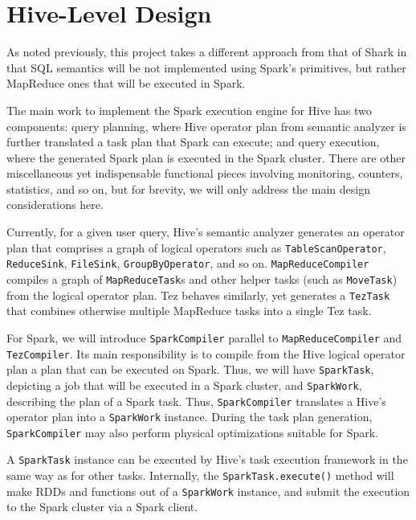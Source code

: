 \documentclass{vldb}
\begin{document}
\section{Hive-Level Design}

As noted previously, this project takes a different approach from that
of Shark in that SQL semantics will be not implemented using Spark's
primitives, but rather MapReduce ones that will be executed in Spark.

The main work to implement the Spark execution engine for Hive has two
components: query planning, where Hive operator plan from semantic
analyzer is further translated a task plan that Spark can execute; and
query execution, where the generated Spark plan is executed in the Spark
cluster. There are other miscellaneous yet indispensable functional
pieces involving monitoring, counters, statistics, and so on, but for
brevity, we will only address the main design considerations here.


Currently, for a given user query, Hive's semantic analyzer generates an
operator plan that comprises a graph of logical operators such as
\texttt{TableScanOperator}, \texttt{ReduceSink}, \texttt{FileSink},
\texttt{GroupByOperator}, and so on. \texttt{MapReduceCompiler} compiles
a graph of \texttt{MapReduceTask}s and other helper tasks (such as
\texttt{MoveTask}) from the logical operator plan. Tez behaves
similarly, yet generates a \texttt{TezTask} that combines otherwise
multiple MapReduce tasks into a single Tez task.

For Spark, we will introduce \texttt{SparkCompiler} parallel to
\texttt{MapReduceCompiler} and \texttt{TezCompiler}. Its main
responsibility is to compile from the Hive logical operator plan a plan
that can be executed on Spark. Thus, we will have \texttt{SparkTask},
depicting a job that will be executed in a Spark cluster, and
\texttt{SparkWork}, describing the plan of a Spark task. Thus,
\texttt{SparkCompiler} translates a Hive's operator plan into a
\texttt{SparkWork} instance. During the task plan generation,
\texttt{SparkCompiler} may also perform physical optimizations suitable
for Spark.~~~


A \texttt{SparkTask} instance can be executed by Hive's task execution
framework in the same way as for other tasks. Internally, the
\texttt{SparkTask.execute()} method will make RDDs and functions out of
a \texttt{SparkWork} instance, and submit the execution to the Spark
cluster via a Spark client.
\end{document}
